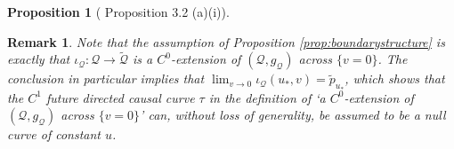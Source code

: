 \documentclass{article}
\newcommand{\Q}{\mathcal{Q}}
\newtheorem{prop}[definition]{Proposition}
\newtheorem{remark}[definition]{Remark}
\begin{document}
\begin{prop}[\cite{CameronSbierski} Proposition 3.2 (a)(i)]
\end{prop}

\begin{remark} \label{RemEquivDefAcross}
    Note that the assumption of Proposition \ref{prop:boundarystructure} is exactly that $\iota_{\Q} : \Q \to \tilde{\Q}$ is a $C^0$-extension of $(\Q,g_{\Q})$ across $\{v=0\}$. The conclusion in particular implies that $\lim_{v \to 0} \iota_{\Q}(u_*,v) = \tilde{p}_{u_*}$, which shows that the $C^1$ future directed causal curve $\tau$ in the definition of `a $C^0$-extension of $(\Q,g_{\Q})$ across $\{v=0\}$' can, without loss of generality, be assumed to be a null curve of constant $u$.
\end{remark}
\end{document}
